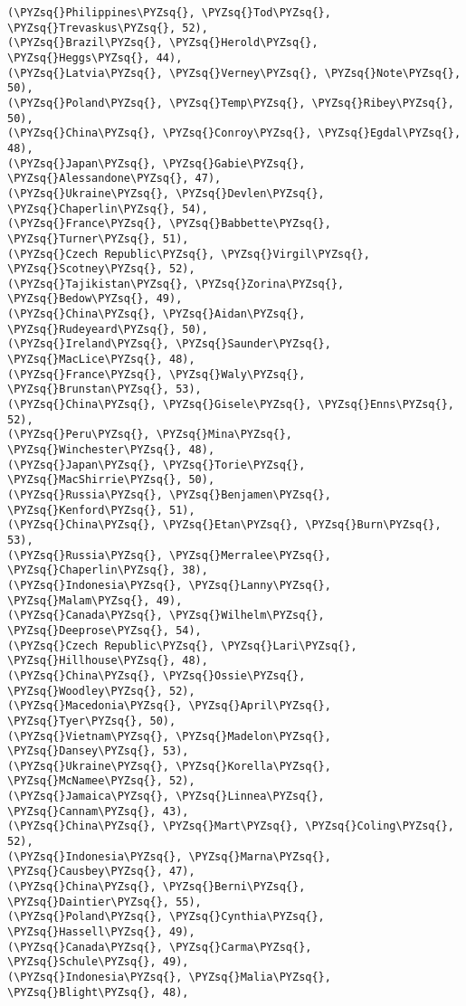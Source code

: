 \documentclass[11pt]{article}
\def\PYZsq{\textquotesingle}%
\def\PYZsq{\char`\'}
\begin{document}
\begin{tcolorbox}[breakable, size=fbox, boxrule=1pt, pad at break*=1mm,colback=cellbackground, colframe=cellborder]
\begin{Verbatim}[commandchars=\\\{\}]
(\PYZsq{}Philippines\PYZsq{}, \PYZsq{}Tod\PYZsq{}, \PYZsq{}Trevaskus\PYZsq{}, 52),
(\PYZsq{}Brazil\PYZsq{}, \PYZsq{}Herold\PYZsq{}, \PYZsq{}Heggs\PYZsq{}, 44),
(\PYZsq{}Latvia\PYZsq{}, \PYZsq{}Verney\PYZsq{}, \PYZsq{}Note\PYZsq{}, 50),
(\PYZsq{}Poland\PYZsq{}, \PYZsq{}Temp\PYZsq{}, \PYZsq{}Ribey\PYZsq{}, 50),
(\PYZsq{}China\PYZsq{}, \PYZsq{}Conroy\PYZsq{}, \PYZsq{}Egdal\PYZsq{}, 48),
(\PYZsq{}Japan\PYZsq{}, \PYZsq{}Gabie\PYZsq{}, \PYZsq{}Alessandone\PYZsq{}, 47),
(\PYZsq{}Ukraine\PYZsq{}, \PYZsq{}Devlen\PYZsq{}, \PYZsq{}Chaperlin\PYZsq{}, 54),
(\PYZsq{}France\PYZsq{}, \PYZsq{}Babbette\PYZsq{}, \PYZsq{}Turner\PYZsq{}, 51),
(\PYZsq{}Czech Republic\PYZsq{}, \PYZsq{}Virgil\PYZsq{}, \PYZsq{}Scotney\PYZsq{}, 52),
(\PYZsq{}Tajikistan\PYZsq{}, \PYZsq{}Zorina\PYZsq{}, \PYZsq{}Bedow\PYZsq{}, 49),
(\PYZsq{}China\PYZsq{}, \PYZsq{}Aidan\PYZsq{}, \PYZsq{}Rudeyeard\PYZsq{}, 50),
(\PYZsq{}Ireland\PYZsq{}, \PYZsq{}Saunder\PYZsq{}, \PYZsq{}MacLice\PYZsq{}, 48),
(\PYZsq{}France\PYZsq{}, \PYZsq{}Waly\PYZsq{}, \PYZsq{}Brunstan\PYZsq{}, 53),
(\PYZsq{}China\PYZsq{}, \PYZsq{}Gisele\PYZsq{}, \PYZsq{}Enns\PYZsq{}, 52),
(\PYZsq{}Peru\PYZsq{}, \PYZsq{}Mina\PYZsq{}, \PYZsq{}Winchester\PYZsq{}, 48),
(\PYZsq{}Japan\PYZsq{}, \PYZsq{}Torie\PYZsq{}, \PYZsq{}MacShirrie\PYZsq{}, 50),
(\PYZsq{}Russia\PYZsq{}, \PYZsq{}Benjamen\PYZsq{}, \PYZsq{}Kenford\PYZsq{}, 51),
(\PYZsq{}China\PYZsq{}, \PYZsq{}Etan\PYZsq{}, \PYZsq{}Burn\PYZsq{}, 53),
(\PYZsq{}Russia\PYZsq{}, \PYZsq{}Merralee\PYZsq{}, \PYZsq{}Chaperlin\PYZsq{}, 38),
(\PYZsq{}Indonesia\PYZsq{}, \PYZsq{}Lanny\PYZsq{}, \PYZsq{}Malam\PYZsq{}, 49),
(\PYZsq{}Canada\PYZsq{}, \PYZsq{}Wilhelm\PYZsq{}, \PYZsq{}Deeprose\PYZsq{}, 54),
(\PYZsq{}Czech Republic\PYZsq{}, \PYZsq{}Lari\PYZsq{}, \PYZsq{}Hillhouse\PYZsq{}, 48),
(\PYZsq{}China\PYZsq{}, \PYZsq{}Ossie\PYZsq{}, \PYZsq{}Woodley\PYZsq{}, 52),
(\PYZsq{}Macedonia\PYZsq{}, \PYZsq{}April\PYZsq{}, \PYZsq{}Tyer\PYZsq{}, 50),
(\PYZsq{}Vietnam\PYZsq{}, \PYZsq{}Madelon\PYZsq{}, \PYZsq{}Dansey\PYZsq{}, 53),
(\PYZsq{}Ukraine\PYZsq{}, \PYZsq{}Korella\PYZsq{}, \PYZsq{}McNamee\PYZsq{}, 52),
(\PYZsq{}Jamaica\PYZsq{}, \PYZsq{}Linnea\PYZsq{}, \PYZsq{}Cannam\PYZsq{}, 43),
(\PYZsq{}China\PYZsq{}, \PYZsq{}Mart\PYZsq{}, \PYZsq{}Coling\PYZsq{}, 52),
(\PYZsq{}Indonesia\PYZsq{}, \PYZsq{}Marna\PYZsq{}, \PYZsq{}Causbey\PYZsq{}, 47),
(\PYZsq{}China\PYZsq{}, \PYZsq{}Berni\PYZsq{}, \PYZsq{}Daintier\PYZsq{}, 55),
(\PYZsq{}Poland\PYZsq{}, \PYZsq{}Cynthia\PYZsq{}, \PYZsq{}Hassell\PYZsq{}, 49),
(\PYZsq{}Canada\PYZsq{}, \PYZsq{}Carma\PYZsq{}, \PYZsq{}Schule\PYZsq{}, 49),
(\PYZsq{}Indonesia\PYZsq{}, \PYZsq{}Malia\PYZsq{}, \PYZsq{}Blight\PYZsq{}, 48),

\end{Verbatim}
\end{tcolorbox}
\end{document}

